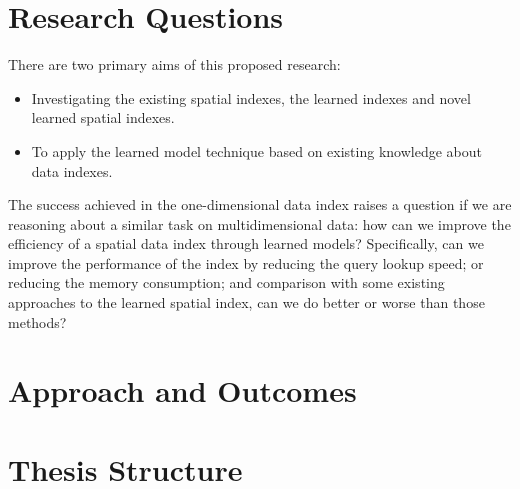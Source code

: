 \section{Research Questions}
There are two primary aims of this proposed research: 
\begin{itemize}
\item Investigating the existing spatial indexes, the learned indexes and novel learned spatial indexes.
\item To apply the learned model technique based on existing knowledge about data indexes. 
\end{itemize}

The success achieved in the one-dimensional data index raises a question if we are reasoning about a similar task on multidimensional data: how can we improve the efficiency of a spatial data index through learned models? Specifically, can we improve the performance of the index by reducing the query lookup speed; or reducing the memory consumption; and comparison with some existing approaches to the learned spatial index, can we do better or worse than those methods? 



\section{Approach and Outcomes}


\section{Thesis Structure}
